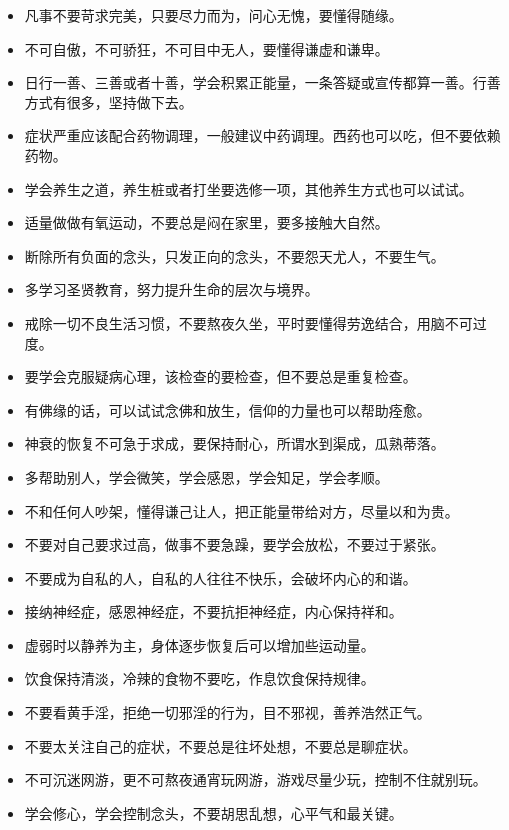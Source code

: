 \begin{itemize}
    \item 凡事不要苛求完美，只要尽力而为，问心无愧，要懂得随缘。
    \item 不可自傲，不可骄狂，不可目中无人，要懂得谦虚和谦卑。
    \item 日行一善、三善或者十善，学会积累正能量，一条答疑或宣传都算一善。行善方式有很多，坚持做下去。
    \item 症状严重应该配合药物调理，一般建议中药调理。西药也可以吃，但不要依赖药物。
    \item 学会养生之道，养生桩或者打坐要选修一项，其他养生方式也可以试试。
    \item 适量做做有氧运动，不要总是闷在家里，要多接触大自然。
    \item 断除所有负面的念头，只发正向的念头，不要怨天尤人，不要生气。
    \item 多学习圣贤教育，努力提升生命的层次与境界。
    \item 戒除一切不良生活习惯，不要熬夜久坐，平时要懂得劳逸结合，用脑不可过度。
    \item 要学会克服疑病心理，该检查的要检查，但不要总是重复检查。
    \item 有佛缘的话，可以试试念佛和放生，信仰的力量也可以帮助痊愈。
    \item 神衰的恢复不可急于求成，要保持耐心，所谓水到渠成，瓜熟蒂落。
    \item 多帮助别人，学会微笑，学会感恩，学会知足，学会孝顺。
    \item 不和任何人吵架，懂得谦己让人，把正能量带给对方，尽量以和为贵。
    \item 不要对自己要求过高，做事不要急躁，要学会放松，不要过于紧张。
    \item 不要成为自私的人，自私的人往往不快乐，会破坏内心的和谐。
    \item 接纳神经症，感恩神经症，不要抗拒神经症，内心保持祥和。
    \item 虚弱时以静养为主，身体逐步恢复后可以增加些运动量。
    \item 饮食保持清淡，冷辣的食物不要吃，作息饮食保持规律。
    \item 不要看黄手淫，拒绝一切邪淫的行为，目不邪视，善养浩然正气。
    \item 不要太关注自己的症状，不要总是往坏处想，不要总是聊症状。
    \item 不可沉迷网游，更不可熬夜通宵玩网游，游戏尽量少玩，控制不住就别玩。
    \item 学会修心，学会控制念头，不要胡思乱想，心平气和最关键。
\end{itemize}

